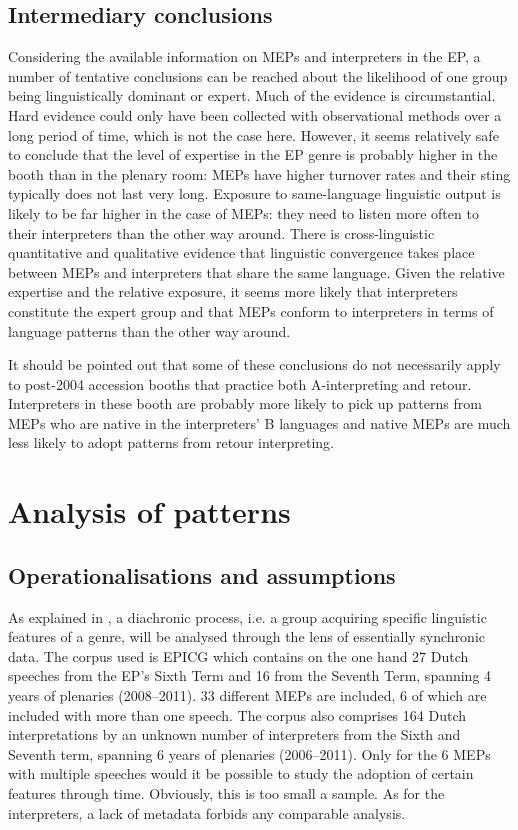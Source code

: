 \documentclass[output=paper]{langscibook}
\begin{document}
\subsection{Intermediary conclusions}\label{sec:defrancq:4.4}

Considering the available information on MEPs and interpreters in the EP, a number of tentative conclusions can be reached about the likelihood of one group being linguistically dominant or expert. Much of the evidence is circumstantial. Hard evidence could only have been collected with observational methods over a long period of time, which is not the case here. However, it seems relatively safe to conclude that the level of expertise in the EP genre is probably higher in the booth than in the plenary room: MEPs have higher turnover rates and their sting typically does not last very long. Exposure to same-language linguistic output is likely to be far higher in the case of MEPs: they need to listen more often to their interpreters than the other way around. There is cross-linguistic quantitative and qualitative evidence that linguistic convergence takes place between MEPs and interpreters that share the same language. Given the relative expertise and the relative exposure, it seems more likely that interpreters constitute the expert group and that MEPs conform to interpreters in terms of language patterns than the other way around.   

It should be pointed out that some of these conclusions do not necessarily apply to post-2004 accession booths that practice both A-interpreting and retour. Interpreters in these booth are probably more likely to pick up patterns from MEPs who are native in the interpreters’ B languages and native MEPs are much less likely to adopt patterns from retour interpreting.

\section{Analysis of patterns}\label{sec:defrancq:5}

\subsection{Operationalisations and assumptions}\label{sec:defrancq:5.1}
\begin{sloppypar}
As explained in , a diachronic process, i.e. a group acquiring specific linguistic features of a genre, will be analysed through the lens of essentially synchronic data. The corpus used is EPICG which contains on the one hand 27 Dutch speeches from the EP’s Sixth Term and 16 from the Seventh Term, spanning 4 years of plenaries (2008--2011). 33 different MEPs are included, 6 of which are included with more than one speech. The corpus also comprises 164 Dutch interpretations by an unknown number of interpreters from the Sixth and Seventh term, spanning 6 years of plenaries (2006--2011). Only for the 6 MEPs with multiple speeches would it be possible to study the adoption of certain features through time. Obviously, this is too small a sample. As for the interpreters, a lack of metadata forbids any comparable analysis.
\end{sloppypar}
\end{document}
